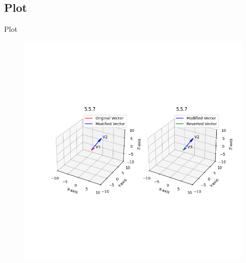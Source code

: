 \documentclass{beamer}
\theoremstyle{remark}
\numberwithin{equation}{section}
\begin{document}
\subsection{Plot}
\begin{frame}{Plot}
 \begin{figure}[H]
    \centering
    \includegraphics[width=0.75\columnwidth]{../figs/python.png}
    \caption*{}
    \label{fig:plot}
\end{figure}
\end{frame}
\end{document}
